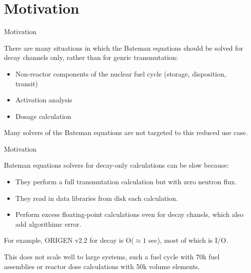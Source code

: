 \documentclass[xcolor=x11names,compress]{beamer}
\begin{document}
\section{Motivation}
\begin{frame}{Motivation}

    There are many situations in which the Bateman equations 
    \cite{bateman1910solution} should be solved for decay channels only, 
    rather than for genric transmutation:
    
    \vspace*{1em}
    \begin{itemize}
        \item Non-reactor components of the nuclear fuel cycle (storage, 
              disposition, transit)
        \item Activation analysis
        \item Dosage calculation
    \end{itemize}

    Many solvers of the Bateman equations are not targeted to this reduced 
    use case.

\end{frame}

\begin{frame}{Motivation}

    Bateman equations solvers for decay-only calculations can be slow because:
    
    \vspace*{1em}
    \begin{itemize}
        \item They perform a full transmutation calculation but with zero
              neutron flux.
        \item They read in data libraries from disk each calculation.
        \item Perform excess floating-point calculations even for decay
              chanels, which also add algorithimc error.
    \end{itemize}

    For example, ORIGEN v2.2 for decay is O($\approx 1$ sec), most of which is
    I/O.

    \vspace*{1em}
    This does not scale well to large systems, such a fuel cycle with 70k 
    fuel assemblies or reactor dose calculations with 50k volume elements.

\end{frame}
\end{document}
